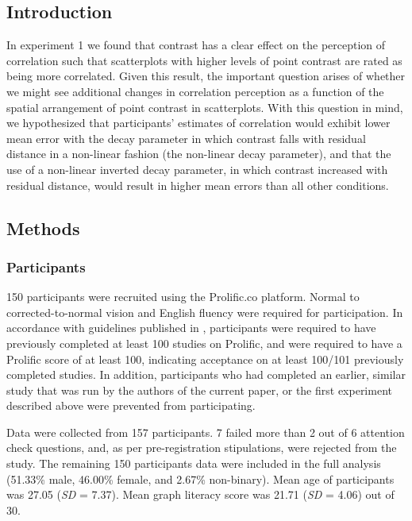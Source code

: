 \documentclass[preprint, 3p,
authoryear]{elsarticle} %
\begin{document}
\hypertarget{introduction-2}{%
\subsection{Introduction}\label{introduction-2}}

In experiment 1 we found that contrast has a clear effect on the
perception of correlation such that scatterplots with higher levels of
point contrast are rated as being more correlated. Given this result,
the important question arises of whether we might see additional changes
in correlation perception as a function of the spatial arrangement of
point contrast in scatterplots. With this question in mind, we
hypothesized that participants' estimates of correlation would exhibit
lower mean error with the decay parameter in which contrast falls with
residual distance in a non-linear fashion (the non-linear decay
parameter), and that the use of a non-linear inverted decay parameter,
in which contrast increased with residual distance, would result in
higher mean errors than all other conditions.

\hypertarget{methods}{%
\subsection{Methods}\label{methods}}

\hypertarget{participants-1}{%
\subsubsection{Participants}\label{participants-1}}

150 participants were recruited using the Prolific.co platform. Normal
to corrected-to-normal vision and English fluency were required for
participation. In accordance with guidelines published in
\citep{peer_2021}, participants were required to have previously
completed at least 100 studies on Prolific, and were required to have a
Prolific score of at least 100, indicating acceptance on at least
100/101 previously completed studies. In addition, participants who had
completed an earlier, similar study that was run by the authors of the
current paper, or the first experiment described above were prevented
from participating.

Data were collected from 157 participants. 7 failed more than 2 out of 6
attention check questions, and, as per pre-registration stipulations,
were rejected from the study. The remaining 150 participants data were
included in the full analysis (51.33\% male, 46.00\% female, and 2.67\%
non-binary). Mean age of participants was 27.05 (\emph{SD} = 7.37). Mean
graph literacy score was 21.71 (\emph{SD} = 4.06) out of 30.
\end{document}
